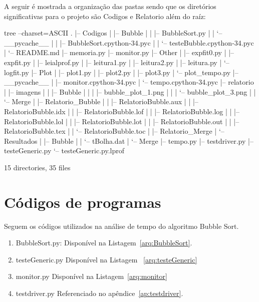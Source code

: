 \documentclass[12pt,a4paper,twoside]{report}
\begin{document}
A seguir é mostrada a organização das pastas sendo que os diretórios significativas para o projeto são Codigos e Relatorio além do raíz:
\begin{terminal}
tree --charset=ASCII
.
|-- Codigos
|   |-- Bubble
|   |   |-- BubbleSort.py
|   |   `-- __pycache__
|   |       |-- BubbleSort.cpython-34.pyc
|   |       `-- testeBubble.cpython-34.pyc
|   `-- README.md
|-- memoria.py
|-- monitor.py
|-- Other
|   |-- expfit0.py
|   |-- expfit.py
|   |-- leialprof.py
|   |-- leitura1.py
|   |-- leitura2.py
|   |-- leitura.py
|   `-- logfit.py
|-- Plot
|   |-- plot1.py
|   |-- plot2.py
|   |-- plot3.py
|   `-- plot_tempo.py
|-- __pycache__
|   |-- monitor.cpython-34.pyc
|   `-- tempo.cpython-34.pyc
|-- relatorio
|   |-- imagens
|   |   |-- Bubble
|   |   |   |-- bubble_plot_1.png
|   |   |   `-- bubble_plot_3.png
|   |   `-- Merge
|   |-- Relatorio_Bubble
|   |   |-- RelatorioBubble.aux
|   |   |-- RelatorioBubble.idx
|   |   |-- RelatorioBubble.lof
|   |   |-- RelatorioBubble.log
|   |   |-- RelatorioBubble.lol
|   |   |-- RelatorioBubble.lot
|   |   |-- RelatorioBubble.out
|   |   |-- RelatorioBubble.tex
|   |   `-- RelatorioBubble.toc
|   |-- Relatorio_Merge
|   `-- Resultados
|       |-- Bubble
|       |   `-- tBolha.dat
|       `-- Merge
|-- tempo.py
|-- testdriver.py
|-- testeGeneric.py
`-- testeGeneric.py.lprof

15 directories, 35 files

\end{terminal}

\section{Códigos de programas}
Seguem os códigos utilizados na análise de tempo do algoritmo Bubble Sort.
\begin{enumerate}

\item BubbleSort.py:
Disponível na Listagem~\ref{arq:BubbleSort}.


\item testeGeneric.py
Disponível na Listagem ~\ref{arq:testeGeneric}


\item monitor.py
Disponível na Listagem~\ref{arq:monitor}



\item testdriver.py
 Referenciado no apêndice~\ref{ap:testdriver}.
\end{enumerate}
\end{document}
